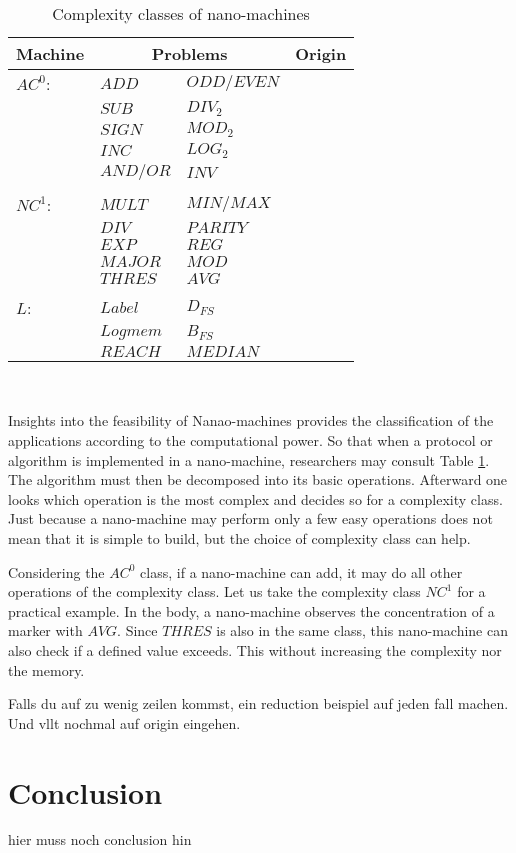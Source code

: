 \documentclass[10pt,sigconf]{acmart}
\begin{document}
\begin{table}[h!]
\begin{tabular}{ p{1.5cm}|p{2cm} p{2cm}|p{1.5cm} }
  \hline
  Machine & \multicolumn{2}{c|}{Problems}  & Origin\\
  \hline
  $AC^0$: & $ADD$ & $ODD/EVEN$&  \\
          & $SUB$ & $DIV_{2}$&  \\
          & $SIGN$ & $MOD_{2}$&  \\
          & $INC$ & $LOG_{2}$&  \\
          & $AND/OR$ & $INV$&  \\
          &  & &  \\
  $NC^1$:   & $MULT$ &$MIN/MAX$   & \\
           & $DIV$ & $PARITY$&  \\
           & $EXP$ & $REG$&  \\
           & $MAJOR$ & $MOD$&  \\
           & $THRES$ & $AVG$&  \\
           &  & &  \\
  $L$:      &   $Label$ &$D_{FS}$ &     \\
           & $Log mem$ & $B_{FS}$&  \\
           & $REACH$ & $MEDIAN$&  \\
          
  \hline 
  \end{tabular}\\
  
  \caption{Complexity classes of nano-machines}
  \label{table1}
  \end{table}
Insights into the feasibility of Nanao-machines provides the classification of the applications according to the computational power. 
So that when a protocol or algorithm is implemented in a nano-machine, researchers may consult Table \ref{table1}.
The algorithm must then be decomposed into its basic operations. Afterward one looks which operation is the most complex and decides so for a complexity class.
Just because a nano-machine may perform only a few easy operations does not mean that it is simple to build, but the choice of complexity class can help.


Considering the $AC^0$ class, if a nano-machine can add, it may do all other operations of the complexity class.
Let us take the complexity class $NC^1$ for a practical example. In the body, a nano-machine observes the concentration of a marker with $AVG$.
Since $THRES$ is also in the same class, this nano-machine can also check if a defined value exceeds. This without increasing the complexity nor the memory.

Falls du auf zu wenig zeilen kommst, ein reduction beispiel auf jeden fall machen. Und vllt nochmal auf origin eingehen.



\section{Conclusion}
hier muss noch conclusion hin 








 
\end{document}
